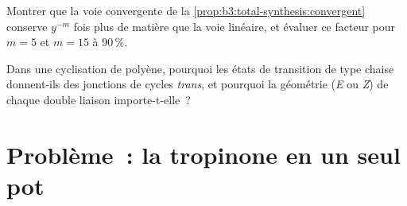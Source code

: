 \begin{exercise}[$\star\star\star$]\label{exo:b3:total-synthesis:11}
Montrer que la voie convergente de la \cref{prop:b3:total-synthesis:convergent}
conserve $y^{-m}$ fois plus de matière que la voie linéaire, et évaluer ce facteur pour $m = 5$ et
$m = 15$ à 90\,\%.
\end{exercise}

\begin{exercise}[$\star\star\star$]\label{exo:b3:total-synthesis:12}
Dans une cyclisation de polyène, pourquoi les états de transition de type chaise donnent-ils des jonctions de cycles \textit{trans},
et pourquoi la géométrie (\textit{E} ou \textit{Z}) de chaque double liaison importe-t-elle~?
\end{exercise}

\section{Problème~: la tropinone en un seul pot}

